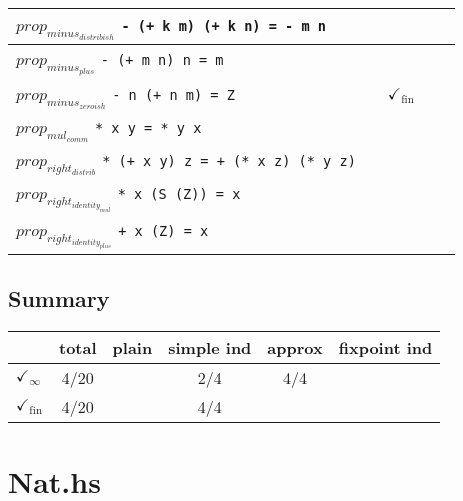 \documentclass{article}
\begin{document}
\begin{longtable}{p{10cm} || c | c | c | c | }
\hline
$prop_{minus_{distribish}}$ \newline \verb`- (+ k m) (+ k n) = - m n` &  &  &  &  \\
\hline
$prop_{minus_{plus}}$ \newline \verb`- (+ m n) n = m` &  &  &  &  \\
\hline
$prop_{minus_{zeroish}}$ \newline \verb`- n (+ n m) = Z` &  & $\checkmark_{\mathrm{fin}}$ &  &  \\
\hline
$prop_{mul_{comm}}$ \newline \verb`* x y = * y x` &  &  &  &  \\
\hline
$prop_{right_{distrib}}$ \newline \verb`* (+ x y) z = + (* x z) (* y z)` &  &  &  &  \\
\hline
$prop_{right_{identity_{mul}}}$ \newline \verb`* x (S (Z)) = x` &  &  &  &  \\
\hline
$prop_{right_{identity_{plus}}}$ \newline \verb`+ x (Z) = x` &  &  &  &  \\
\end{longtable}

\subsection*{Summary}
\begin{longtable}{p{4cm} || c | c | c | c | c | }
  & total & plain & simple ind & approx & fixpoint ind \\
\hline
$\checkmark_{\infty}$ & 4/20 &  & 2/4 & 4/4 & \\
\hline
$\checkmark_{\mathrm{fin}}$ & 4/20 &  & 4/4 &  & \\
\end{longtable}

\section*{Nat.hs}
\end{document}
